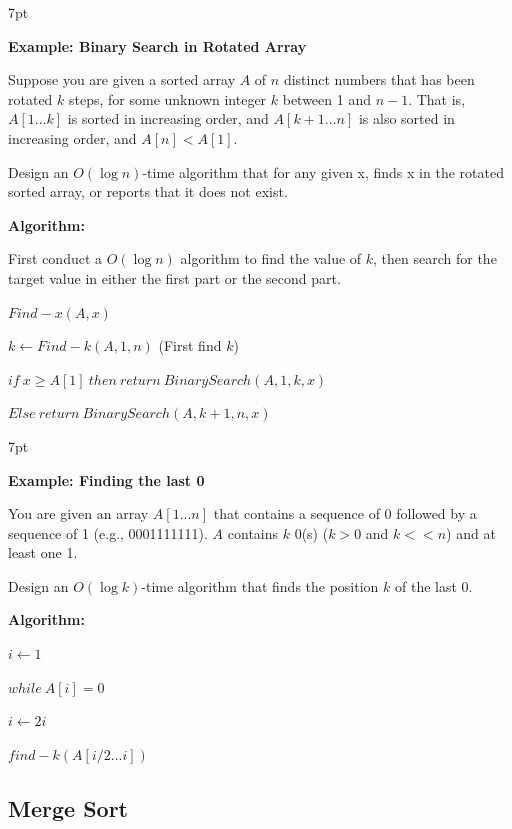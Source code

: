 \documentclass[10pt]{article}
\newenvironment{formal}[2]{%
	\def\FrameCommand{%
		\hspace{1pt}%
		{\color{#1}\vrule width 2pt}%
		{\color{#2}\vrule width 4pt}%
		\colorbox{#2}%
	}%
	\MakeFramed{\advance\hsize-\width\FrameRestore}%
	\noindent\hspace{-4.55pt}%
	\begin{adjustwidth}{}{7pt}%
		\vspace{2pt}\vspace{2pt}%
	}
	{%
		\vspace{2pt}\end{adjustwidth}\endMakeFramed%
}
\begin{document}
\begin{formal}{Brown}{brownshade}
	
	\textbf{Example: Binary Search in Rotated Array}
	
	Suppose you are given a sorted array $A$ of $n$ distinct numbers that 
	has been rotated $k$ steps, for some unknown integer $k$ between 1 and $n-1$. That is, $A[1 ... k]$ is sorted in increasing order, and $A[k+1 ... n]$ is also sorted in increasing order, and $A[n] < A[1]$.
	
	Design an $O(\log n)$-time algorithm that for any given x, 
	finds x in the rotated sorted array, or reports that it does not 
	exist.
	
	\noindent \textbf{Algorithm:}
	
	First conduct a $O(\log n)$ algorithm to find the value of $k$, then search for the target value in either the first part or the second part.
	
	$Find-x(A, x)$
	
	$k \leftarrow Find-k(A, 1, n)$ (First find $k$)
	
	$if\ x \geq A[1]\ then\ return\ BinarySearch(A, 1, k, x)$
	
	$Else\ return\ BinarySearch(A, k+1, n, x)$
	
\end{formal}

\newpage

\begin{formal}{Brown}{brownshade}
	
	\textbf{Example: Finding the last 0}
	
	You are given an array $A[1 ... n]$ that contains a sequence of 0 
	followed by a sequence of 1 (e.g., 0001111111). $A$ contains $k$ 0(s) ($k>0$ and $k<<n$) and at least one 1.
	
	Design an $O(\log k)$-time algorithm that finds the position $k$ of the last 0.

	\noindent \textbf{Algorithm:}
	
	$i\leftarrow1$
	
	$while\ A[i]=0$
	
	\quad \quad $i\leftarrow2i$
	
	$find-k(A[i/2 ... i])$

\end{formal}

\subsection{Merge Sort}
\end{document}
